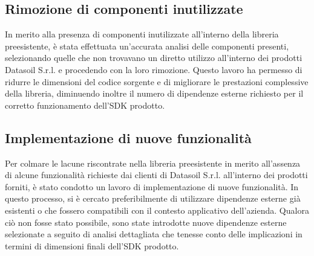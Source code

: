 \subsection{Rimozione di componenti inutilizzate}
In merito alla presenza di componenti inutilizzate all'interno della libreria preesistente, è stata effettuata un'accurata analisi delle componenti presenti, selezionando
quelle che non trovavano un diretto utilizzo all'interno dei prodotti Datasoil S.r.l. e procedendo con la loro rimozione. \newline
Questo lavoro ha permesso di ridurre le dimensioni del codice sorgente e di migliorare le prestazioni complessive della libreria, diminuendo inoltre il numero di dipendenze
esterne richiesto per il corretto funzionamento dell'SDK prodotto.

\subsection{Implementazione di nuove funzionalità}
Per colmare le lacune riscontrate nella libreria preesistente in merito all'assenza di alcune funzionalità richieste dai clienti di Datasoil S.r.l. all'interno dei prodotti forniti,
è stato condotto un lavoro di implementazione di nuove funzionalità. \newline
In questo processo, si è cercato preferibilmente di utilizzare dipendenze esterne già esistenti o che fossero compatibili con il contesto applicativo dell'azienda. Qualora ciò non
fosse stato possibile, sono state introdotte nuove dipendenze esterne selezionate a seguito di analisi dettagliata che tenesse conto delle implicazioni in termini di dimensioni
finali dell'SDK prodotto.


